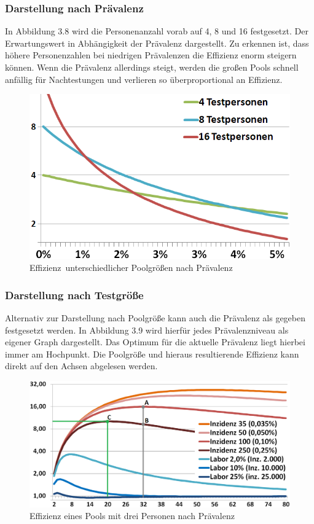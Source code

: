 \subsubsection{Darstellung nach Prävalenz}
In Abbildung 3.8 wird die Personenanzahl vorab auf 4, 8 und 16 festgesetzt.
Der Erwartungswert in Abhängigkeit der Prävalenz dargestellt.
Zu erkennen ist, dass höhere Personenzahlen bei niedrigen Prävalenzen die Effizienz enorm steigern können.
Wenn die Prävalenz allerdings steigt, werden die großen Pools schnell anfällig für Nachtestungen und verlieren so überproportional an Effizienz.

\begin{figure}[h]
	\centering
	\includegraphics[width=1\textwidth]{img/PraevalenzZuTestgruppe}
	\caption{\mbox{Effizienz unterschiedlicher} \mbox{Poolgrößen} nach Prävalenz\footnotemark}
\end{figure}

\cleardoublepage

\subsubsection{Darstellung nach Testgröße}
Alternativ zur Darstellung nach Poolgröße kann auch die Prävalenz als gegeben festgesetzt werden.
In Abbildung 3.9 wird hierfür jedes Prävalenzniveau als eigener Graph dargestellt.
Das Optimum für die aktuelle Prävalenz liegt hierbei immer am Hochpunkt.
Die Poolgröße und hieraus resultierende Effizienz kann direkt auf den Achsen abgelesen werden.
\begin{figure}[h]
	\centering
	\includegraphics[width=1\textwidth]{img/EffizienzTestgruppePfeile}
	\caption{Effizienz eines Pools mit drei Personen nach Prävalenz\footnotemark}
\end{figure}

